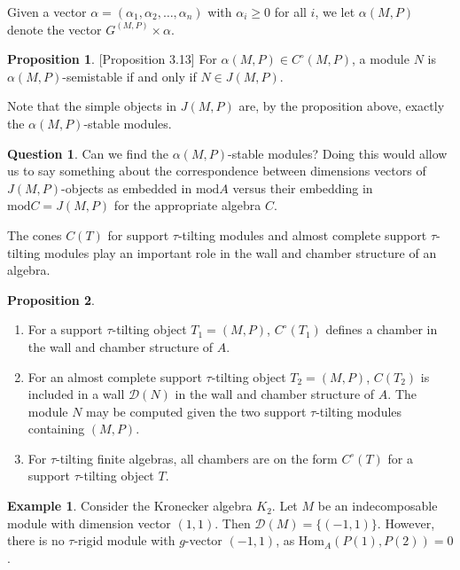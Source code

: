 \documentclass[]{article}
\theoremstyle{definition}
\newtheorem{proposition}{Proposition}[section]
\newtheorem{example}{Example}[section]
\newtheorem{question}{Question}
\newcommand{\tu}{\ensuremath{\tau}}
\begin{document}
Given a vector $\alpha = (\alpha_1,\alpha_2,\dots,\alpha_n)$ with $\alpha_i \geq 0$ for all $i$, we let $\alpha(M,P)$ denote the vector $G^{(M,P)} \times \alpha$.

\begin{proposition}\cite{Br_stle_2019}[Proposition 3.13]
	For $\alpha(M,P) \in C^\circ(M,P)$, a module $N$ is $\alpha(M,P)$-semistable if and only if $N \in J(M,P)$.
\end{proposition}

Note that the simple objects in $J(M,P)$ are, by the proposition above, exactly the $\alpha(M,P)$-stable modules.

\begin{question}
	Can we find the $\alpha(M,P)$-stable modules? Doing this would allow us to say something about the correspondence between dimensions vectors of $J(M,P)$-objects as embedded in $\text{mod} A$ versus their embedding in $\text{mod} C = J(M,P)$ for the appropriate algebra $C$.
\end{question}



The cones $C(T)$ for support \tu-tilting modules and almost complete support \tu-tilting modules play an important role in the wall and chamber structure of an algebra.

\begin{proposition}\cite[Proposition 3.15, Corollary 3.16, Corollary 3.21]{Br_stle_2019}\label{tau-wall-chamber-result}
	\begin{enumerate}
		\item For a support \tu-tilting object $T_1 = (M,P)$, $C^\circ(T_1)$ defines a chamber in the wall and chamber structure of $A$.
		\item For an almost complete support \tu-tilting object $T_2 = (M,P)$, $C(T_2)$ is included in a wall $\mathcal{D}(N)$ in the wall and chamber structure of $A$. The module $N$ may be computed given the two support \tu-tilting modules containing $(M,P)$.
		\item For \tu-tilting finite algebras, all chambers are on the form $C^\circ(T)$ for a support \tu-tilting object $T$.
		
	\end{enumerate}
\end{proposition}


\begin{example}
	Consider the Kronecker algebra $K_2$. Let $M$ be an indecomposable module with dimension vector $(1,1)$. Then $\mathcal{D}(M) = \{(-1,1)\}$. However, there is no \tu-rigid module with $g$-vector $(-1,1)$, as $\text{Hom}_A(P(1),P(2)) = 0$.
\end{example}
\end{document}
